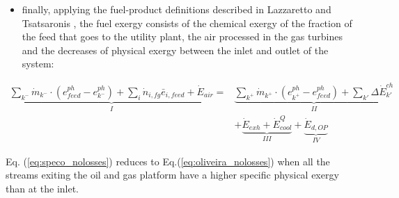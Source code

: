 \begin{itemize}
	\item finally, applying the fuel-product definitions described in Lazzaretto and Tsatsaronis \cite{Lazzaretto1999,Lazzaretto2006}, the fuel exergy consists of the chemical exergy of the fraction of the feed that goes to the utility plant, the air processed in the gas turbines and the decreases of physical exergy between the inlet and outlet of the system:
\end{itemize}

 \begin{align}
	\underbrace{\sum_{k^{-}} \dot{m}_{k^{-}}\cdot(e_{feed}^{ph}-e_{k^{-}}^{ph})+\sum_i \dot{n}_{i,fg}\bar{e}_{i,feed}+\dot{E}_{air}}_{I}=&\underbrace{\sum_{k^{+}}\dot{m}_{k^{+}}\cdot(e_{k^{+}}^{ph}-e_{feed}^{ph})+\sum_{k'}\Delta{\dot{E}}^{ch}_{k'}}_{II}\nonumber\\
	&+\underbrace{\dot{E}_{exh}+\dot{E}^Q_{cool}}_{III}+\underbrace{\dot{E}_{d,OP}}_{IV}
	\label{eq:speco_nolosses}
\end{align}	

Eq. (\ref{eq:speco_nolosses}) reduces to Eq.(\ref{eq:oliveira_nolosses}) when all the streams exiting the oil and gas platform have a higher specific physical exergy than at the inlet.

